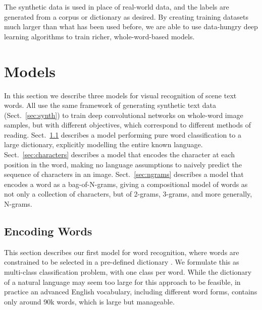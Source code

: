 \documentclass{article} \usepackage{nips14submit_e,times}
\newcommand{\sref}[1]{Sect.~\ref{#1}}
\begin{document}
The synthetic data is used in place of real-world data, and the labels are generated from a corpus or dictionary as desired. By creating training datasets much larger than what has been used before, we are able to use data-hungry deep learning algorithms to train richer, whole-word-based models.

\section{Models}\label{sec:architectures}


In this section we describe three models for visual recognition of scene text words.
All use the same framework of generating synthetic text data (\sref{sec:synth}) to train deep convolutional networks on whole-word image samples, but with different objectives, which correspond to different methods of reading. \sref{sec:dictionary} describes a model performing pure word classification to a large dictionary, explicitly modelling the entire known language. \sref{sec:characters} describes a model that encodes the character at each position in the word, making no language assumptions to naively predict the sequence of characters in an image. \sref{sec:ngrams} describes a model that encodes a word as a bag-of-N-grams, giving a compositional model of words as not only a collection of characters, but of 2-grams, 3-grams, and more generally, N-grams. 

\subsection{Encoding Words}\label{sec:dictionary}
This section describes our first model for word recognition, where words  are constrained to be selected in a pre-defined dictionary . We formulate this as multi-class classification problem, with one class per word. While the dictionary  of a natural language may seem too large for this approach to be feasible, in practice an advanced English vocabulary, including different word forms, contains only around 90k words, which is large but manageable.
\end{document}
